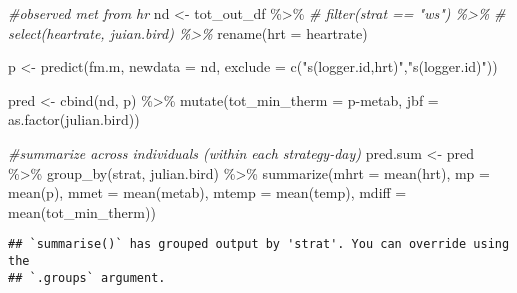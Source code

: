 \documentclass[
]{article}
\newenvironment{Shaded}{\begin{snugshade}}{\end{snugshade}}
\newcommand{\AttributeTok}[1]{\textcolor[rgb]{0.77,0.63,0.00}{#1}}
\newcommand{\CommentTok}[1]{\textcolor[rgb]{0.56,0.35,0.01}{\textit{#1}}}
\newcommand{\FunctionTok}[1]{\textcolor[rgb]{0.00,0.00,0.00}{#1}}
\newcommand{\NormalTok}[1]{#1}
\newcommand{\OtherTok}[1]{\textcolor[rgb]{0.56,0.35,0.01}{#1}}
\newcommand{\SpecialCharTok}[1]{\textcolor[rgb]{0.00,0.00,0.00}{#1}}
\newcommand{\StringTok}[1]{\textcolor[rgb]{0.31,0.60,0.02}{#1}}
\begin{document}
\begin{Shaded}
\begin{Highlighting}[]
\CommentTok{\#observed met from hr}
\NormalTok{nd }\OtherTok{\textless{}{-}}\NormalTok{ tot\_out\_df }\SpecialCharTok{\%\textgreater{}\%} 
  \CommentTok{\# filter(strat == "ws") \%\textgreater{}\% }
  \CommentTok{\# select(heartrate, juian.bird) \%\textgreater{}\% }
  \FunctionTok{rename}\NormalTok{(}\AttributeTok{hrt =}\NormalTok{ heartrate) }

\NormalTok{p }\OtherTok{\textless{}{-}} \FunctionTok{predict}\NormalTok{(fm.m,}
                \AttributeTok{newdata =}\NormalTok{ nd,}
                \AttributeTok{exclude =} \FunctionTok{c}\NormalTok{(}\StringTok{"s(logger.id,hrt)"}\NormalTok{,}\StringTok{"s(logger.id)"}\NormalTok{))}

\NormalTok{pred }\OtherTok{\textless{}{-}} \FunctionTok{cbind}\NormalTok{(nd, p) }\SpecialCharTok{\%\textgreater{}\%} 
  \FunctionTok{mutate}\NormalTok{(}\AttributeTok{tot\_min\_therm =}\NormalTok{ p}\SpecialCharTok{{-}}\NormalTok{metab,}
         \AttributeTok{jbf =} \FunctionTok{as.factor}\NormalTok{(julian.bird)) }

\CommentTok{\#summarize across individuals (within each strategy{-}day)}
\NormalTok{pred.sum }\OtherTok{\textless{}{-}}\NormalTok{ pred }\SpecialCharTok{\%\textgreater{}\%} 
  \FunctionTok{group\_by}\NormalTok{(strat, julian.bird) }\SpecialCharTok{\%\textgreater{}\%} 
  \FunctionTok{summarize}\NormalTok{(}\AttributeTok{mhrt =} \FunctionTok{mean}\NormalTok{(hrt),}
          \AttributeTok{mp =} \FunctionTok{mean}\NormalTok{(p),}
          \AttributeTok{mmet =} \FunctionTok{mean}\NormalTok{(metab),}
          \AttributeTok{mtemp =} \FunctionTok{mean}\NormalTok{(temp),}
          \AttributeTok{mdiff =} \FunctionTok{mean}\NormalTok{(tot\_min\_therm))}
\end{Highlighting}
\end{Shaded}

\begin{verbatim}
## `summarise()` has grouped output by 'strat'. You can override using the
## `.groups` argument.
\end{verbatim}
\end{document}
